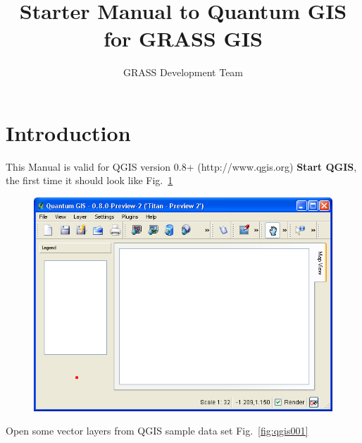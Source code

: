 %


\title{Starter Manual to Quantum GIS for GRASS GIS}
\subtitle{}
\author{GRASS Development Team}

\maketitle

\section{Introduction}

This Manual is valid for QGIS version 0.8+ (http://www.qgis.org)
\textbf{Start QGIS}, the first time it should look like Fig.~\ref{fig:qgis000}

\begin{figure}[htbp]
   \centering
   \includegraphics[scale=0.35]{qgis000.png}
   \caption{}
   \label{fig:qgis000}
\end{figure}

Open some vector layers from QGIS sample data set Fig.~\ref{fig:qgis001}

